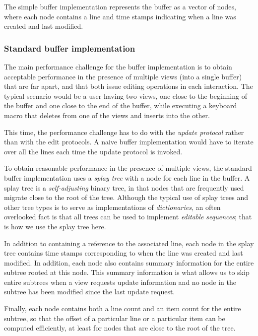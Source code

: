 The simple buffer implementation represents the buffer as a
\commonlisp{} vector of nodes, where each node contains a line and
time stamps indicating when a line was created and last modified.

\subsubsection{Standard buffer implementation}

The main performance challenge for the buffer implementation is to
obtain acceptable performance in the presence of multiple views (into
a single buffer) that are far apart, and that both issue editing
operations in each interaction.  The typical scenario would be a user
having two views, one close to the beginning of the buffer and one
close to the end of the buffer, while executing a keyboard macro that
deletes from one of the views and inserts into the other.

This time, the performance challenge has to do with the \emph{update
  protocol} rather than with the edit protocols.  A naive buffer
implementation would have to iterate over all the lines each time the
update protocol is invoked.

To obtain reasonable performance in the presence of multiple views,
the standard buffer implementation uses a \emph{splay tree}
\cite{Sleator:1985:SBS:3828.3835} with a node for each line in the
buffer.  A splay tree is a \emph{self-adjusting} binary tree, in that
nodes that are frequently used migrate close to the root of the tree.
Although the typical use of splay trees and other tree types is to
serve as implementations of \emph{dictionaries}, an often overlooked
fact is that all trees can be used to implement \emph{editable
  sequences}; that is how we use the splay tree here.

In addition to containing a reference to the associated line, each
node in the splay tree contains time stamps corresponding to when the
line was created and last modified.  In addition, each node also
contains summary information for the entire subtree rooted at this
node.  This summary information is what allows us to skip entire
subtrees when a view requests update information and no node in the
subtree has been modified since the last update request.

Finally, each node contains both a line count and an item count for
the entire subtree, so that the offset of a particular line or a
particular item can be computed efficiently, at least for nodes that
are close to the root of the tree.
